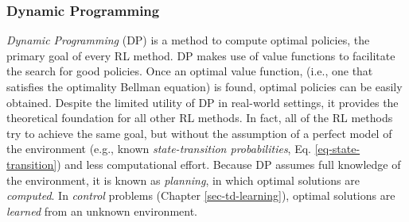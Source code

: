 \documentclass[a4paper, twoside, 12pt]{article}
\begin{document}
\subsubsection{Dynamic Programming}
\label{sec:orge8dec3c}
\emph{Dynamic Programming} (DP) is a method to compute optimal policies, the primary
goal of every RL method. DP makes use of value functions to facilitate the
search for good policies. Once an optimal value function, (i.e., one that
satisfies the optimality Bellman equation) is found, optimal policies can be
easily obtained. Despite the limited utility of DP in real-world settings, it
provides the theoretical foundation for all other RL methods. In fact, all of
the RL methods try to achieve the same goal, but without the assumption of a
perfect model of the environment (e.g., known \emph{state-transition probabilities},
Eq. \ref{eq-state-transition}) and less computational effort. Because DP assumes
full knowledge of the environment, it is known as \emph{planning}, in which optimal
solutions are \emph{computed}. In \emph{control} problems (Chapter \ref{sec-td-learning}),
optimal solutions are \emph{learned} from an unknown environment.
\end{document}
